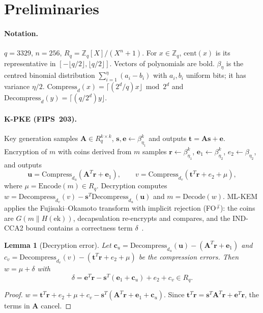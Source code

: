 \documentclass[11pt,a4paper]{article}
\newtheorem{lemma}[theorem]{Lemma}
\theoremstyle{definition}
\theoremstyle{remark}
\newcommand{\Z}{\mathbb{Z}}
\newcommand{\cent}{\mathrm{cent}}
\begin{document}
\section{Preliminaries}\label{sec:prelim}

\paragraph{Notation.} $q=3329$, $n=256$, $R_q=\Z_q[X]/(X^n+1)$. For $x\in\Z_q$, $\cent(x)$ is its representative in $[-\lfloor q/2\rfloor,\lfloor q/2\rfloor]$. Vectors of polynomials are bold. $\beta_\eta$ is the centred binomial distribution $\sum_{i=1}^{\eta}(a_i-b_i)$ with $a_i,b_i$ uniform bits; it has variance $\eta/2$. $\mathrm{Compress}_d(x)=\lceil (2^d/q)x\rfloor \bmod 2^d$ and $\mathrm{Decompress}_d(y)=\lceil (q/2^d)y\rfloor$.

\paragraph{K-PKE (FIPS~203).} Key generation samples $\mathbf A\in R_q^{k\times k}$, $\mathbf s,\mathbf e\leftarrow\beta_{\eta_1}^k$ and outputs $\mathbf t=\mathbf A\mathbf s+\mathbf e$. Encryption of $m$ with coins derived from $m$ samples $\mathbf r\leftarrow\beta_{\eta_1}^k$, $\mathbf e_1\leftarrow\beta_{\eta_2}^k$, $e_2\leftarrow\beta_{\eta_2}$, and outputs
\[ \mathbf u = \mathrm{Compress}_{d_u}(\mathbf A^T\mathbf r+\mathbf e_1),\qquad v=\mathrm{Compress}_{d_v}(\mathbf t^T\mathbf r+e_2+\mu), \]
where $\mu=\mathrm{Encode}(m)\in R_q$. Decryption computes $w=\mathrm{Decompress}_{d_v}(v)-\mathbf s^T\mathrm{Decompress}_{d_u}(\mathbf u)$ and $m=\mathrm{Decode}(w)$. ML-KEM applies the Fujisaki--Okamoto transform with implicit rejection (FO$^{\not\perp}$): the coins are $G(m\|H(\mathrm{ek}))$, decapsulation re-encrypts and compares, and the IND-CCA2 bound contains a correctness term $\delta$~\cite{hhk17}.

\begin{lemma}[Decryption error]\label{lem:err}
Let $\mathbf c_u=\mathrm{Decompress}_{d_u}(\mathbf u)-(\mathbf A^T\mathbf r+\mathbf e_1)$ and $c_v=\mathrm{Decompress}_{d_v}(v)-(\mathbf t^T\mathbf r+e_2+\mu)$ be the compression errors. Then $w=\mu+\delta$ with
\[ \delta = \mathbf e^T\mathbf r-\mathbf s^T(\mathbf e_1+\mathbf c_u)+e_2+c_v \in R_q. \]
\end{lemma}
\begin{proof}
$w=\mathbf t^T\mathbf r+e_2+\mu+c_v-\mathbf s^T(\mathbf A^T\mathbf r+\mathbf e_1+\mathbf c_u)$. Since $\mathbf t^T\mathbf r=\mathbf s^T\mathbf A^T\mathbf r+\mathbf e^T\mathbf r$, the terms in $\mathbf A$ cancel.
\end{proof}
\end{document}
